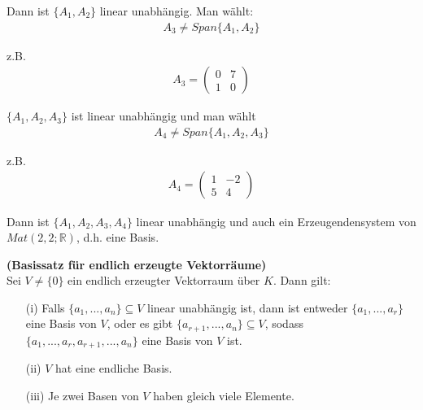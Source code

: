 \documentclass[11pt]{report}
\newcommand*\Zb[1] {\mathbb{#1}}
\newcommand*\f[1] {\textbf{#1}}
\begin{document}
Dann ist $\{A_1, A_2\}$ linear unabhängig. Man wählt:
\begin{align}
 A_3 \neq Span\{A_1, A_2\}
\end{align}

z.B. 
\begin{align}
 A_3 = \begin{pmatrix} 0 & 7 \\ 1 & 0 \end{pmatrix}
\end{align}

$\{A_1, A_2, A_3\}$ ist linear unabhängig und man wählt
\begin{align}
 A_4 \neq Span\{A_1, A_2, A_3\}
\end{align}

z.B.
\begin{align}
 A_4 = \begin{pmatrix} 1 & -2 \\ 5 & 4 \end{pmatrix}
\end{align}

Dann ist $\{A_1, A_2, A_3, A_4\}$ linear unabhängig und auch ein Erzeugendensystem von $Mat(2,2;\Zb{R})$, d.h. eine Basis.

\begin{satz} \f{(Basissatz für endlich erzeugte Vektorräume)} \\
 \label{satz342}
Sei $V\neq \{0\}$ ein endlich erzeugter Vektorraum über $K$. Dann gilt:
\begin{itemize}
 \item[(i)] Falls $\{a_1, ..., a_n\} \subseteq V$ linear unabhängig ist, dann ist entweder $\{a_1, ..., a_r\}$ eine Basis von $V$, oder es gibt $\{a_{r+1}, ..., a_n\} \subseteq V$, sodass $\{a_1, ..., a_r, a_{r+1}, ..., a_n\}$ eine Basis von $V$ ist.
 \item[(ii)] $V$ hat eine endliche Basis.
 \item[(iii)] Je zwei Basen von $V$ haben gleich viele Elemente.
\end{itemize}
\end{satz}
\end{document}
